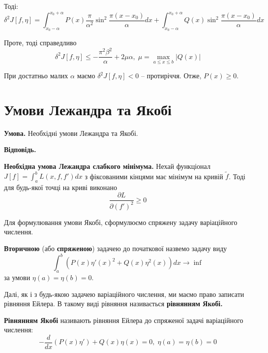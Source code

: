 \documentclass[14pt]{extarticle}
\newcommand{\<}{\langle}
\renewcommand{\>}{\rangle}
\theoremstyle{mystyle}{\newtheorem{definition}{Definition}[section]}
\theoremstyle{mystyle}{\newtheorem{proposition}[definition]{Proposition}}
\theoremstyle{mystyle}{\newtheorem{theorem}[definition]{Theorem}}
\theoremstyle{mystyle}{\newtheorem{lemma}[definition]{Lemma}}
\theoremstyle{mystyle}{\newtheorem{corollary}[definition]{Corollary}}
\theoremstyle{mystyle}{\newtheorem*{remark}{Remark}}
\theoremstyle{mystyle}{\newtheorem*{remarks}{Remarks}}
\theoremstyle{mystyle}{\newtheorem*{example}{Example}}
\theoremstyle{mystyle}{\newtheorem*{examples}{Examples}}
\theoremstyle{definition}{\newtheorem*{exercise}{Exercise}}
\theoremstyle{cstyle}{\newtheorem*{cthm}{}}
\theoremstyle{warn}
\begin{document}
Тоді:
\begin{equation}
    \delta^2 J[f,\eta] = \int_{x_0-\alpha}^{x_0+\alpha} P(x) \frac{\pi}{\alpha^2}\sin^2 \frac{\pi(x-x_0)}{\alpha}dx + \int_{x_0-\alpha}^{x_0+\alpha}Q(x) \sin^2 \frac{\pi(x-x_0)}{\alpha}dx
\end{equation}

Проте, тоді справедливо 
\begin{equation}
    \delta^2 J[f,\eta] \leq -\frac{\pi^2\beta^2}{\alpha} + 2\mu\alpha, \; \mu = \max_{a \leq x \leq b}|Q(x)|
\end{equation}

При достатньо малих $\alpha$ маємо $\delta^2 J[f,\eta] < 0$ -- протиріччя. Отже, $P(x) \geq 0$.

\pagebreak

\section{Умови Лежандра та Якобі}

\textbf{Умова.} Необхідні умови Лежандра та Якобі.

\textbf{Відповідь.}

\begin{theorem}
    \textbf{Необхідна умова Лежандра слабкого мінімума.} Нехай функціонал $J[f]=\int_a^b L(x,f,f')dx$ з фіксованими кінцями має мінімум на кривій $\widetilde{f}$. Тоді для будь-якої точці на криві виконано 
    \begin{equation}
        \frac{\partial L}{\partial (f')^2} \geq 0
    \end{equation}
\end{theorem}

Для формулювання умови Якобі, сформулюємо спряжену задачу варіаційного числення.

\begin{definition}
    \textbf{Вторичною} (або \textbf{спряженою}) задачею до початкової назвемо задачу виду
    \begin{equation}
        \int_a^b (P(x)\eta'(x)^2 + Q(x)\eta^2(x))dx \to \inf 
    \end{equation}
    за умови $\eta(a)=\eta(b)=0$. 
\end{definition}

Далі, як і з будь-якою задачею варіаційного числення, ми маємо право записати рівняння Ейлера. В такому виді рівняння називається \textbf{рівнянням Якобі.}

\begin{definition}
\textbf{Рівнянням Якобі} називають рівняння Ейлера до спряженої задачі варіаційного числення:
\begin{equation}
    -\frac{d}{dx}(P(x)\eta') + Q(x)\eta(x) = 0, \; \eta(a)=\eta(b)=0
\end{equation}
\end{definition}
\end{document}
